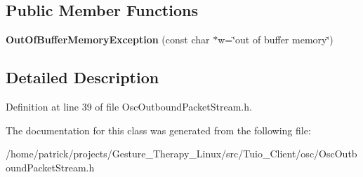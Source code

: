 \subsection*{Public Member Functions}
\begin{DoxyCompactItemize}
\item 
\mbox{\label{classosc_1_1_out_of_buffer_memory_exception_adce75aa5d918ea2d901058a1381103bd}} 
{\bfseries Out\+Of\+Buffer\+Memory\+Exception} (const char $\ast$w=\char`\"{}out of buffer memory\char`\"{})
\end{DoxyCompactItemize}


\subsection{Detailed Description}


Definition at line 39 of file Osc\+Outbound\+Packet\+Stream.\+h.



The documentation for this class was generated from the following file\+:\begin{DoxyCompactItemize}
\item 
/home/patrick/projects/\+Gesture\+\_\+\+Therapy\+\_\+\+Linux/src/\+Tuio\+\_\+\+Client/osc/Osc\+Outbound\+Packet\+Stream.\+h\end{DoxyCompactItemize}
